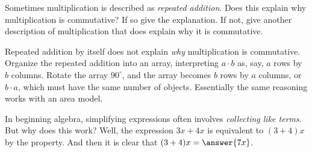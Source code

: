 \documentclass[nooutcomes]{ximera}
\begin{document}
\begin{problem}Sometimes multiplication is described as \textit{repeated
  addition}. Does this explain why multiplication is commutative? If
  so give the explanation. If not, give another description of
  multiplication that does explain why it is commutative.
\begin{freeResponse}
\begin{hint}
Repeated addition by itself does not explain \textit{why} multiplication is commutative.  Organize the repeated addition into an array, interpreting $a\cdot b$ as, say, $a$ rows by $b$ columns.  Rotate the array $90^\circ$, and the array becomes $b$ rows by $a$ columns, or $b\cdot a$, which must have the same number of objects.  Essentially the same reasoning works with an area model.  
\end{hint}
\end{freeResponse}
\end{problem} 

\begin{problem}
In beginning algebra, simplifying expressions often involves \textit{collecting like terms}.  But why does this work?  Well, the expression $3x+4x$ is equivalent to $(3+4)x$ by the  property.  And then it is clear that $(3+4)x = \answer{7x}$. 
\end{problem}
\end{document}
